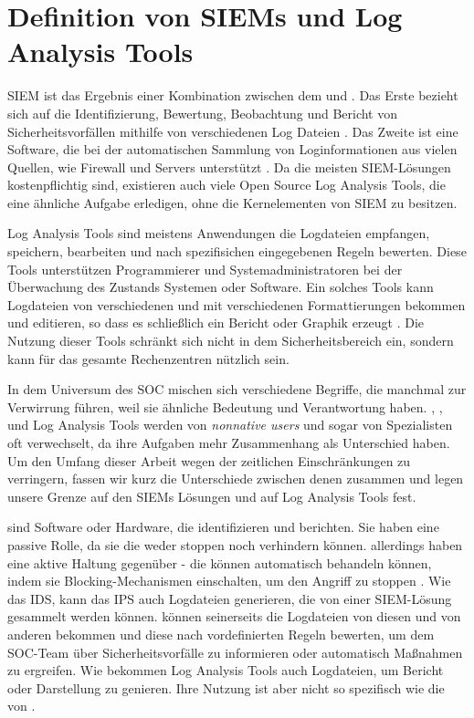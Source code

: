 \section{Definition von SIEMs und Log Analysis Tools}

\gls{SIEM} ist das Ergebnis einer Kombination zwischen dem  und  \citep{Dorigo_SIEM}. Das Erste bezieht sich auf die Identifizierung, Bewertung, Beobachtung und Bericht von Sicherheitsvorfällen mithilfe von verschiedenen Log Dateien \citep{techopedia_SEM}. Das Zweite ist eine Software, die bei der automatischen Sammlung von Loginformationen aus vielen Quellen, wie Firewall und Servers unterstützt \citep{techopedia_SIM}. Da die meisten \gls{SIEM}-Lösungen kostenpflichtig sind, existieren auch viele \gls{Open Source} Log Analysis Tools, die eine ähnliche Aufgabe erledigen, ohne die Kernelementen von \gls{SIEM} zu besitzen. 

Log Analysis Tools sind meistens Anwendungen die Logdateien empfangen, speichern, bearbeiten und nach spezifisichen eingegebenen Regeln bewerten. Diese Tools unterstützen Programmierer und Systemadministratoren bei der Überwachung des Zustands Systemen oder Software. Ein solches Tools kann Logdateien von verschiedenen  und mit verschiedenen Formattierungen bekommen und editieren, so dass es schließlich ein Bericht oder Graphik erzeugt \citep{Korzeniowski_LATDef}. Die Nutzung dieser Tools schränkt sich nicht in dem Sicherheitsbereich ein, sondern kann für das gesamte Rechenzentren nützlich sein.


In dem Universum des \gls{SOC} mischen sich verschiedene Begriffe, die manchmal zur Verwirrung führen, weil sie ähnliche Bedeutung und Verantwortung haben. , ,  und Log Analysis Tools werden von \textit{nonnative users}  und sogar von Spezialisten oft verwechselt, da ihre Aufgaben mehr Zusammenhang als Unterschied haben. Um den Umfang dieser Arbeit wegen der zeitlichen Einschränkungen zu verringern, fassen wir kurz die Unterschiede zwischen denen zusammen und legen unsere Grenze auf den \glspl{SIEM} Lösungen und auf Log Analysis Tools fest. 

\newpage
{} sind Software oder Hardware, die  identifizieren und berichten. Sie haben eine passive Rolle, da sie die  weder stoppen noch verhindern können. allerdings haben eine aktive Haltung gegenüber  - die können automatisch behandeln können, indem sie Blocking-Mechanismen einschalten, um den Angriff zu stoppen \citep{Wendzel_IS}. Wie das \gls{IDS}, kann das \gls{IPS} auch Logdateien generieren, die von einer \gls{SIEM}-Lösung gesammelt werden können.  können seinerseits die Logdateien von diesen und von anderen  bekommen und diese nach vordefinierten Regeln bewerten, um dem \gls{SOC}-Team über Sicherheitsvorfälle zu informieren oder automatisch Maßnahmen zu ergreifen. Wie  bekommen Log Analysis Tools auch Logdateien, um Bericht oder Darstellung zu genieren. Ihre Nutzung ist aber nicht so spezifisch wie die von . 

